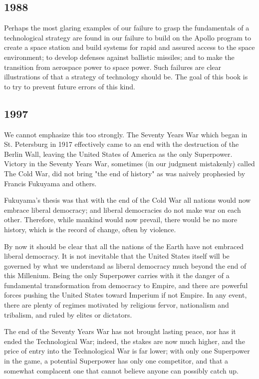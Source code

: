 \documentclass[a4paper,12pt]{book}
\begin{document}
\subsection{1988}
Perhaps the most glaring examples of our failure to grasp the fundamentals of a technological strategy are found in our failure to build on the Apollo program to create a space station and build systems for rapid and assured access to the space environment; to develop defenses against ballistic missiles; and to make the transition from aerospace power to space power. Such failures are clear illustrations of that a strategy of technology should be. The goal of this book is to try to prevent future errors of this kind.

\subsection{1997}
We cannot emphasize this too strongly. The Seventy Years War which began in St. Petersburg in 1917 effectively came to an end with the destruction of the Berlin Wall, leaving the United States of America as the only Superpower. Victory in the Seventy Years War, sometimes (in our judgment mistakenly) called The Cold War, did not bring "the end of history" as was naively prophesied by Francis Fukuyama and others.

Fukuyama's thesis was that with the end of the Cold War all nations would now embrace liberal democracy; and liberal democracies do not make war on each other. Therefore, while mankind would now prevail, there would be no more history, which is the record of change, often by violence.

By now it should be clear that all the nations of the Earth have not embraced liberal democracy. It is not inevitable that the United States itself will be governed by what we understand as liberal democracy much beyond the end of this Millenium. Being the only Superpower carries with it the danger of a fundamental transformation from democracy to Empire, and there are powerful forces pushing the United States toward Imperium if not Empire. In any event, there are plenty of regimes motivated by religious fervor, nationalism and tribalism, and ruled by elites or dictators.

The end of the Seventy Years War has not brought lasting peace, nor has it ended the Technological War; indeed, the stakes are now much higher, and the price of entry into the Technological War is far lower; with only one Superpower in the game, a potential Superpower has only one competitor, and that a somewhat complacent one that cannot believe anyone can possibly catch up.
\end{document}
